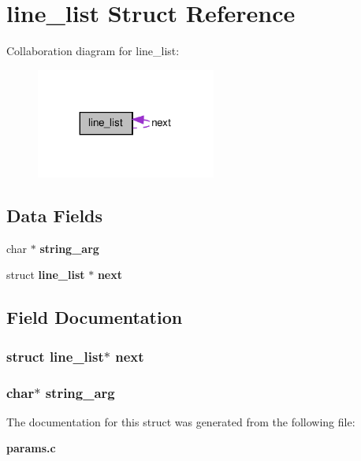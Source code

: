 \section{line\_\-list Struct Reference}
\label{d8/dae/structline__list}


Collaboration diagram for line\_\-list:\nopagebreak
\begin{figure}[H]
\begin{center}
\leavevmode
\includegraphics[width=167pt]{d9/df8/structline__list__coll__graph}
\end{center}
\end{figure}
\subsection*{Data Fields}
\begin{DoxyCompactItemize}
\item 
char $\ast$ {\bf string\_\-arg}
\item 
struct {\bf line\_\-list} $\ast$ {\bf next}
\end{DoxyCompactItemize}


\subsection{Field Documentation}
\subsubsection[{next}]{\setlength{\rightskip}{0pt plus 5cm}struct {\bf line\_\-list}$\ast$ {\bf next}}\label{d8/dae/structline__list_ad41ea66e6cc047edbe477347cb73487d}
\subsubsection[{string\_\-arg}]{\setlength{\rightskip}{0pt plus 5cm}char$\ast$ {\bf string\_\-arg}}\label{d8/dae/structline__list_a9a5dcb426087730237be62a9bf2f83f0}


The documentation for this struct was generated from the following file:\begin{DoxyCompactItemize}
\item 
{\bf params.c}\end{DoxyCompactItemize}
